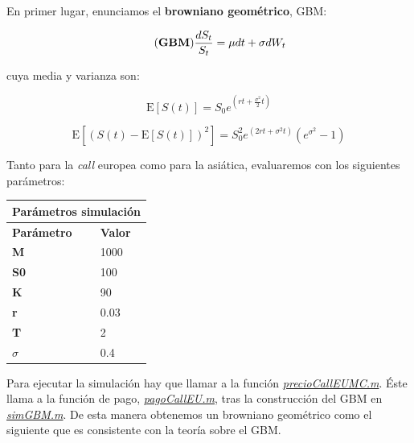 \documentclass[a4paper,11pt]{article}
\begin{document}
En primer lugar, enunciamos el \textbf{browniano geom\'etrico}, GBM:

\begin{equation*}
   \tag{\textbf{GBM}}
   \frac{dS_t}{S_t} = \mu dt + \sigma dW_t
\end{equation*}

cuya media y varianza son:

\begin{equation*}
   \tag{Media}
   \mathrm{E}[S(t)] = S_0 e^{(rt + \frac{\sigma ^2}{2}t)}
\end{equation*}

\begin{equation*}
   \tag{Varianza}
   \mathrm{E}[(S(t) - \mathrm{E}[S(t)])^2] = S_0^2 e^{(2rt +\sigma ^2t)}
   (e^{\sigma ^2} - 1)
\end{equation*}

Tanto para la \textit{call} europea como para la asi\'atica, evaluaremos con los siguientes
par\'ametros:

\begin{center}
\begin{tabular}{|p{3.5cm}|p{3.5cm}|}
\hline
\multicolumn{2}{|c|}{\textbf{Par\'ametros simulaci\'on}}\\
\hline
\hline
\textbf{Par\'ametro} & \textbf{Valor}\\
\hline
\hline
\textbf{M}      & 1000\\
\hline
\textbf{S0}     & 100\\
\hline
\textbf{K}      & 90\\
\hline
\textbf{r}      & 0.03\\
\hline
\textbf{T}      & 2\\
\hline
\textbf{$\sigma$} & 0.4\\
\hline
\end{tabular}
\end{center}

Para ejecutar la simulaci\'on hay que llamar a la funci\'on
\hyperref[precioCallEUMC]{\textit{precioCallEUMC.m}}. \'Este llama a la
funci\'on de pago, \hyperref[pagoCallEU]{\textit{pagoCallEU.m}}, tras la
construcci\'on del GBM en \hyperref[simGBM]{\textit{simGBM.m}}. De esta manera
obtenemos un browniano geom\'etrico como el siguiente que es consistente con
la teor\'ia sobre el GBM.
\end{document}
